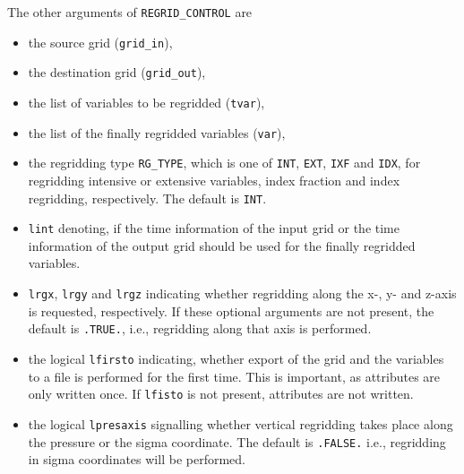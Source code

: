 \documentclass[11pt,twoside]{article}
\begin{document}
The other arguments of \verb|REGRID_CONTROL| are 
\begin{itemize}
\item  the source grid (\verb|grid_in|),
\item  the destination grid (\verb|grid_out|),
\item  the list of variables to be regridded (\verb|tvar|),
\item  the list of the finally regridded variables (\verb|var|),
\item  the regridding type \verb|RG_TYPE|, which is one of \verb|INT|, 
\verb|EXT|, \verb|IXF| and \verb|IDX|, for regridding intensive or extensive
 variables, index fraction and index regridding, respectively. The default is 
\verb|INT|.
\item \verb|lint| denoting, if the time information of the input grid
or the time information
of the output grid should be used for the finally regridded variables.
\item \verb|lrgx|, \verb|lrgy| and \verb|lrgz| indicating whether regridding
 along the x-, y- and z-axis is requested, respectively.
 If these optional arguments are not
present, the default is \verb|.TRUE.|, i.e., regridding along that
axis is performed.
\item the logical \verb|lfirsto| indicating, whether export of the
grid and the variables to a file  is performed for the first time.
This is important,  as attributes
are only written once. If \verb|lfisto| is not present, attributes are
not written.
\item the logical \verb|lpresaxis| signalling whether vertical
regridding takes place along the pressure or the sigma coordinate.
 The default is \verb|.FALSE.| i.e., regridding in sigma coordinates
 will be performed.
\end{itemize}
\end{document}
